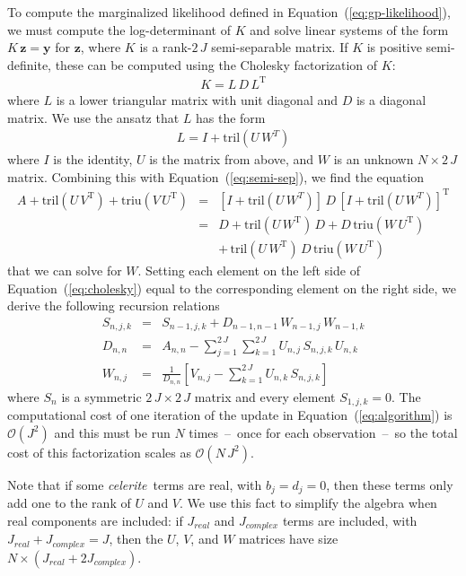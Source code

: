\documentclass[manuscript, letterpaper]{aastex6}
\newcommand{\celeriteterm}{\emph{celerite}}
\renewcommand{\eqref}[1]{\ref{eq:#1}}
\newcommand{\Eq}[1]{Equation~(\eqref{#1})}
\newcommand{\eq}[1]{\Eq{#1}}
\newcommand{\eqlabel}[1]{\label{eq:#1}}
\newcommand{\T}{\ensuremath{\mathrm{T}}}
\newcommand{\bvec}[1]{{\ensuremath{\boldsymbol{#1}}}}
\begin{document}
To compute the marginalized likelihood defined in \eq{gp-likelihood}, we must
compute the log-determinant of $K$ and solve linear systems of the form
$K\,\bvec{z}=\bvec{y}$ for $\bvec{z}$, where $K$ is a rank-$2\,J$
semi-separable matrix.
If $K$ is positive semi-definite, these can be computed using the Cholesky
factorization of $K$:
\begin{eqnarray}
K = L\,D\,L^\T
\end{eqnarray}
where $L$ is a lower triangular matrix with unit diagonal and $D$ is a
diagonal matrix.
We use the ansatz that $L$ has the form
\begin{eqnarray}
    L = I + \mathrm{tril} (U\,W^T)
\end{eqnarray}
where $I$ is the identity, $U$ is the matrix from above, and $W$ is an unknown
$N \times 2\,J$ matrix.
Combining this with \eq{semi-sep}, we find the equation
\begin{eqnarray}\eqlabel{cholesky}
A + \mathrm{tril}(U\,V^\T) + \mathrm{triu}(V\,U^\T)
&=& \left[I + \mathrm{tril} (U\,W^T)\right]\,D\,
    {\left[I + \mathrm{tril} (U\,W^T)\right]}^\T \\
&=& D + \mathrm{tril}(U\,W^\T)\,D
    + D\,\mathrm{triu}(W\,U^\T) \nonumber\\
&& +\, \mathrm{tril}(U\,W^\T)\,D\,\mathrm{triu}(W\,U^\T) \nonumber
\end{eqnarray}
that we can solve for $W$.
Setting each element on the left side of \eq{cholesky} equal to the
corresponding element on the right side, we derive the following recursion
relations
\begin{eqnarray}
S_{n,j,k} &=& S_{n-1,j,k} + D_{n-1,n-1}\,W_{n-1,j}\,W_{n-1,k} \nonumber\\
D_{n,n} &=& A_{n,n} -
    \sum_{j=1}^{2\,J}\sum_{k=1}^{2\,J} U_{n,j}\,S_{n,j,k}\,U_{n,k}
    \nonumber\\
W_{n,j} &=& \frac{1}{D_{n,n}}\left[ V_{n,j} -
    \sum_{k=1}^{2\,J}U_{n,k}\,S_{n,j,k} \right]
    \eqlabel{algorithm}
\end{eqnarray}
where $S_n$ is a symmetric $2\,J \times 2\,J$ matrix and every element
$S_{1,j,k}=0$.
The computational cost of one iteration of the update in \eq{algorithm} is
$\mathcal{O}(J^2)$ and this must be run $N$ times~--~once for each
observation~--~so the total cost of this factorization scales as
$\mathcal{O}(N\,J^2)$.

Note that if some \celeriteterm\ terms are real, with $b_j=d_j=0$,
then these terms only add one to the rank of $U$ and $V$.  We use this fact
to simplify the algebra when real components are included:  if $J_{real}$
and $J_{complex}$ terms are included, with $J_{real}+J_{complex}=J$, then
the $U$, $V$, and $W$ matrices have size $N \times (J_{real}+2J_{complex})$.
\end{document}
